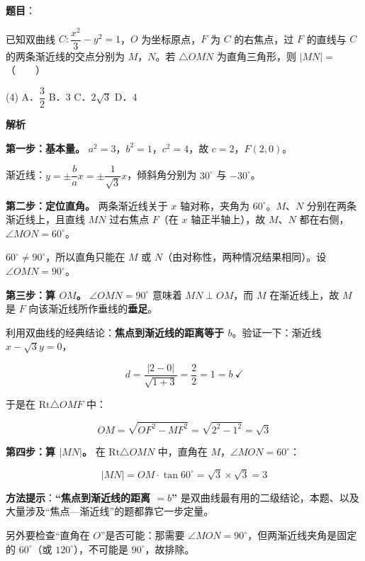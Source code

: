 \begin{answer}

\textbf{题目}：

已知双曲线 $C:\dfrac{x^{2}}3-y^{2}=1$，$O$ 为坐标原点，$F$ 为 $C$ 的右焦点，过 $F$ 的直线与 $C$ 的两条渐近线的交点分别为 $M$，$N$。若 $\triangle OMN$ 为直角三角形，则 $|MN|=$\mbox{（　　）}

\begin{gkopts}(4)
\task A．$\dfrac32$
\task B．$3$
\task C．$2\sqrt3$
\task D．$4$
\end{gkopts}

\textbf{解析}

\textbf{第一步：基本量。} $a^{2}=3$，$b^{2}=1$，$c^{2}=4$，故 $c=2$，$F(2,0)$。

渐近线：$y=\pm\dfrac{b}{a}x=\pm\dfrac1{\sqrt3}x$，倾斜角分别为 $30^\circ$ 与 $-30^\circ$。

\textbf{第二步：定位直角。} 两条渐近线关于 $x$ 轴对称，夹角为 $60^\circ$。$M$、$N$ 分别在两条渐近线上，且直线 $MN$ 过右焦点 $F$（在 $x$ 轴正半轴上），故 $M$、$N$ 都在右侧，$\angle MON=60^\circ$。

$60^\circ\ne90^\circ$，所以直角只能在 $M$ 或 $N$（由对称性，两种情况结果相同）。设 $\angle OMN=90^\circ$。

\textbf{第三步：算 $OM$。} $\angle OMN=90^\circ$ 意味着 $MN\perp OM$，而 $M$ 在渐近线上，故 $M$ 是 $F$ 向该渐近线所作垂线的\textbf{垂足}。

利用双曲线的经典结论：\textbf{焦点到渐近线的距离等于 $b$}。验证一下：渐近线 $x-\sqrt3y=0$，

\nopagebreak[4]
\[d=\frac{|2-0|}{\sqrt{1+3}}=\frac22=1=b\ \checkmark\]

于是在 $\mathrm{Rt}\triangle OMF$ 中：

\nopagebreak[4]
\[OM=\sqrt{OF^{2}-MF^{2}}=\sqrt{2^{2}-1^{2}}=\sqrt3\]

\textbf{第四步：算 $|MN|$。} 在 $\mathrm{Rt}\triangle OMN$ 中，直角在 $M$，$\angle MON=60^\circ$：

\nopagebreak[4]
\[|MN|=OM\cdot\tan60^\circ=\sqrt3\times\sqrt3=3\]

\begin{gktip}
\textbf{方法提示}：\textbf{“焦点到渐近线的距离 $=b$”} 是双曲线最有用的二级结论，本题、以及大量涉及“焦点—渐近线”的题都靠它一步定量。

另外要检查“直角在 $O$”是否可能：那需要 $\angle MON=90^\circ$，但两渐近线夹角是固定的 $60^\circ$（或 $120^\circ$），不可能是 $90^\circ$，故排除。
\end{gktip}


\par\medskip

\end{answer}
